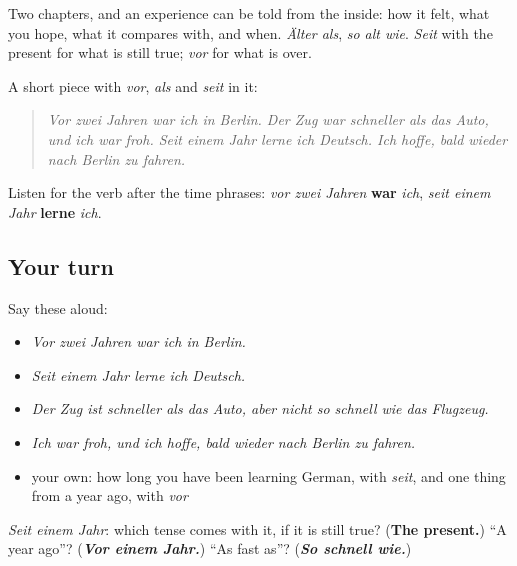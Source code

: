 \begin{grammarlens}[title={What you've built}]
Two chapters, and an experience can be told from the inside: how it felt, what you hope, what it compares with, and when. \emph{Älter als}, \emph{so alt wie}. \emph{Seit} with the present for what is still true; \emph{vor} for what is over.

A short piece with \emph{vor}, \emph{als} and \emph{seit} in it:

\begin{quote}
\emph{Vor zwei Jahren war ich in Berlin. Der Zug war schneller als das Auto, und ich war froh. Seit einem Jahr lerne ich Deutsch. Ich hoffe, bald wieder nach Berlin zu fahren.}
\end{quote}

Listen for the verb after the time phrases: \emph{vor zwei Jahren} \textbf{war} \emph{ich}, \emph{seit einem Jahr} \textbf{lerne} \emph{ich}.
\end{grammarlens}

\subsection*{Your turn}
Say these aloud:

\begin{itemize}
\raggedright
  \item \emph{Vor zwei Jahren war ich in Berlin.}
  \item \emph{Seit einem Jahr lerne ich Deutsch.}
  \item \emph{Der Zug ist schneller als das Auto, aber nicht so schnell wie das Flugzeug.}
  \item \emph{Ich war froh, und ich hoffe, bald wieder nach Berlin zu fahren.}
  \item your own: how long you have been learning German, with \emph{seit}, and one thing from a year ago, with \emph{vor}
\end{itemize}

\begin{tcolorbox}[breakable,colback=teal!4,colframe=teal!35!black,title={Before you move on}]
\emph{Seit einem Jahr}: which tense comes with it, if it is still true? (\textbf{The present.}) \textquotedblleft{}A year ago\textquotedblright{}? (\emph{\textbf{Vor einem Jahr.}}) \textquotedblleft{}As fast as\textquotedblright{}? (\emph{\textbf{So schnell wie.}})
\end{tcolorbox}

